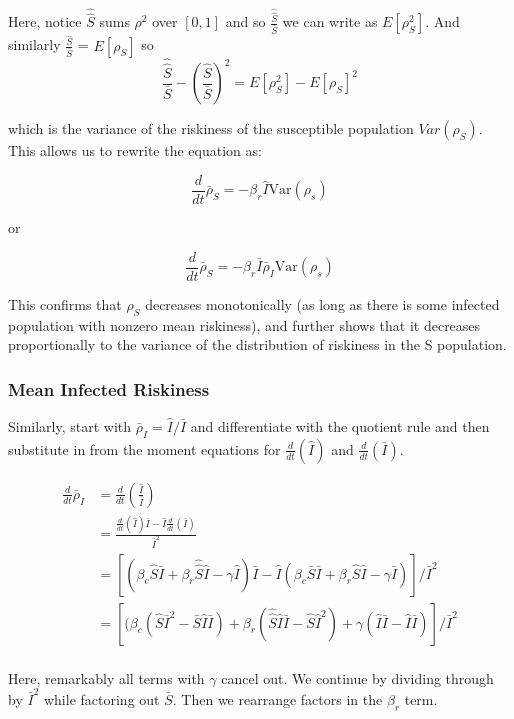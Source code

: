 Here, notice \(\hat{ \hat{ S}}\) sums \(\rho^2\) over \([0, 1]\) and so
\(\frac{\hat{ \hat{ S}}}{\bar S}\) we can write as \(E[\rho_S^2]\). And
similarly \(\frac{\hat S}{\bar S}\) = \(E[\rho_S]\) so \[
\frac{\hat{ \hat{ S}}}{\bar S} - \left(\frac{\hat S}{\bar S}\right)^2
= E[\rho_S^2] - E[\rho_S]^2 
\]

which is the variance of the riskiness of the susceptible population
\(Var(\rho_S)\). This allows us to rewrite the equation as:

\[
\frac{d}{dt}\bar\rho_S = -\beta_r \hat I \text{Var}(\rho_s)
\]

or

\[
\frac{d}{dt}\bar\rho_S = -\beta_r \bar I \bar\rho_I \text{Var}(\rho_s)
\]

This confirms that \(\rho_S\) decreases monotonically (as long as there
is some infected population with nonzero mean riskiness), and further
shows that it decreases proportionally to the variance of the
distribution of riskiness in the S population.

\subsubsection{Mean Infected Riskiness}

Similarly, start with \(\bar \rho_I = \hat I / \bar I\) and
differentiate with the quotient rule and then substitute in from the
moment equations for \(\frac{d}{dt}( \hat I)\) and
\(\frac{d}{dt} ( \bar I )\).

\[
\begin{aligned}
\frac{d}{dt}\bar\rho_I
&= \frac{d}{dt} \left( \frac{\hat I}{\bar I} \right)\\
&= \frac{\frac{d}{dt} (\hat I) \bar I - \hat I \frac{d}{dt}(\bar I)}{\bar I^2}\\
&= \left[(\beta_c \hat S \bar I + \beta_r \hat{\hat S} \hat I - \gamma \hat I) \bar I -
    \hat I (\beta_c \bar S \bar I + \beta_r \hat S \hat I - \gamma \bar I)\right] / \bar I^2 \\
&= \left[(\beta_c (\hat S \bar I^2 - \bar S \hat I \bar I)
    + \beta_r (\hat{\hat S} \hat I \bar I - \hat S \hat I^2)
    + \gamma (\hat I \bar I - \hat I \bar I)\right] / \bar I^2 \\
\end{aligned}
\]

Here, remarkably all terms with \(\gamma\) cancel out. We continue by
dividing through by \(\bar I^2\) while factoring out \(\bar S\). Then we
rearrange factors in the \(\beta_r\) term.

